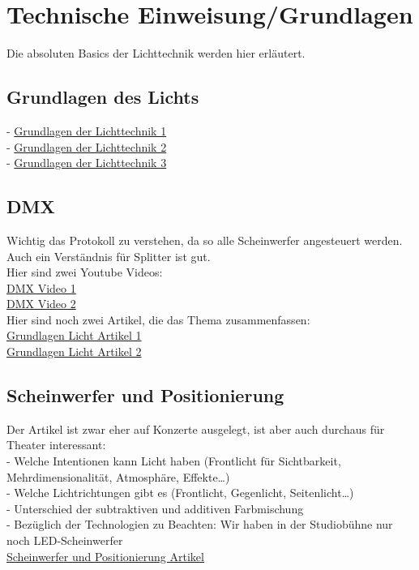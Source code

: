 \section{Technische Einweisung/Grundlagen}\label{sec:einweisung}
Die absoluten Basics der Lichttechnik werden hier erläutert.\\
\subsection{Grundlagen des Lichts}
- \href{https://www.bonedo.de/artikel/crashkurs-grundlagen-der-lichttechnik-1/}{Grundlagen der Lichttechnik 1} \\
- \href{https://www.bonedo.de/artikel/crashkurs-grundlagen-der-lichttechnik-2/}{Grundlagen der Lichttechnik 2} \\
- \href{https://www.bonedo.de/artikel/crashkurs-grundlagen-der-lichttechnik-3/}{Grundlagen der Lichttechnik 3} 

\subsection{DMX}
Wichtig das Protokoll zu verstehen, da so alle Scheinwerfer angesteuert werden. Auch ein Verständnis für Splitter ist gut.\\
Hier sind zwei Youtube Videos: \\
\href{https://youtu.be/w8TdsO8vqgo?feature=shared}{DMX Video 1}\\
\href{https://youtu.be/GMMHAhFN6LQ}{DMX Video 2}\\

\noindent Hier sind noch zwei Artikel, die das Thema zusammenfassen:\\
\href{https://www.stage223.com/wissen/dmx-grundlagen-workshop-wie-funktioniert-dmx/
}{Grundlagen Licht Artikel 1}\\
\href{https://www.delamar.de/eventtechnik/dmx-steuerung-54218/}{Grundlagen Licht Artikel 2}

\subsection{Scheinwerfer und Positionierung}
Der Artikel ist zwar eher auf Konzerte ausgelegt, ist aber auch durchaus für Theater interessant: \\
- Welche Intentionen kann Licht haben (Frontlicht für Sichtbarkeit, Mehrdimensionalität, Atmosphäre, Effekte…)\\
- Welche Lichtrichtungen gibt es (Frontlicht, Gegenlicht, Seitenlicht…)\\
- Unterschied der subtraktiven und additiven Farbmischung \\
- Bezüglich der Technologien zu Beachten: Wir haben in der Studiobühne nur noch LED-Scheinwerfer\\
\href{https://www.stageaid.de/komponenten-einer-lichtanlage-grundlagen/}{Scheinwerfer und Positionierung Artikel} \\


